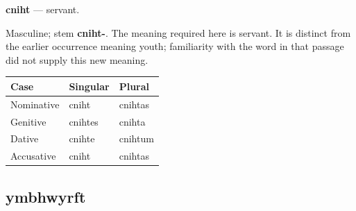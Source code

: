 \par\begin{minipage}{\linewidth}\raggedright
\textbf{cniht} — servant.

Masculine; stem \textbf{cniht-}. The meaning required here is servant. It is distinct from the earlier occurrence meaning youth; familiarity with the word in that passage did not supply this new meaning.

\par\begingroup
\fontsize{10.5}{13.2}\selectfont
\setlength{\LTleft}{0pt}\setlength{\LTright}{\fill}
\noindent
\begin{tabular}{@{}>{\raggedright\arraybackslash}p{39.46mm}>{\raggedright\arraybackslash}p{39.46mm}>{\raggedright\arraybackslash}p{39.46mm}@{}}
\toprule
\textbf{Case} & \textbf{Singular} & \textbf{Plural} \\
\midrule
Nominative & cniht & cnihtas \\
Genitive & cnihtes & cnihta \\
Dative & cnihte & cnihtum \\
Accusative & cniht & cnihtas \\
\bottomrule
\end{tabular}
\par\endgroup

\end{minipage}\par
{}
\subsection*{ymbhwyrft}

